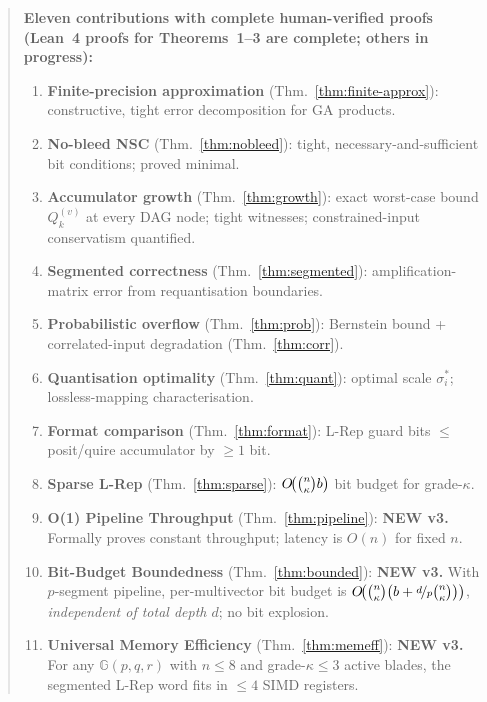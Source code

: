 \documentclass[11pt,a4paper]{article}
\theoremstyle{definition}
\theoremstyle{plain}
\theoremstyle{remark}
\newcommand{\GA}{\mathbb{G}}
\begin{document}
\begin{abstract}
\textbf{Eleven contributions with complete human-verified proofs
(Lean~4 proofs for Theorems~1--3 are complete; others in progress):}
\begin{enumerate}[leftmargin=*,label=\arabic{enumi}.]
  \item \textbf{Finite-precision approximation} (Thm.~\ref{thm:finite-approx}):
        constructive, tight error decomposition for GA products.
  \item \textbf{No-bleed NSC} (Thm.~\ref{thm:nobleed}):
        tight, necessary-and-sufficient bit conditions; proved minimal.
  \item \textbf{Accumulator growth} (Thm.~\ref{thm:growth}):
        exact worst-case bound $Q_k^{(v)}$ at every DAG node;
        tight witnesses; constrained-input conservatism quantified.
  \item \textbf{Segmented correctness} (Thm.~\ref{thm:segmented}):
        amplification-matrix error from requantisation boundaries.
  \item \textbf{Probabilistic overflow} (Thm.~\ref{thm:prob}):
        Bernstein bound + correlated-input degradation (Thm.~\ref{thm:corr}).
  \item \textbf{Quantisation optimality} (Thm.~\ref{thm:quant}):
        optimal scale $\sigma_i^*$; lossless-mapping characterisation.
  \item \textbf{Format comparison} (Thm.~\ref{thm:format}):
        L-Rep guard bits $\le$ posit/quire accumulator by $\ge 1$ bit.
  \item \textbf{Sparse L-Rep} (Thm.~\ref{thm:sparse}):
        $O\!\bigl(\tbinom{n}{\kappa}b\bigr)$ bit budget for grade-$\kappa$.
  \item \textbf{O(1) Pipeline Throughput} (Thm.~\ref{thm:pipeline}): \textbf{NEW v3.}
        Formally proves constant throughput; latency is $O(n)$ for fixed $n$.
  \item \textbf{Bit-Budget Boundedness} (Thm.~\ref{thm:bounded}): \textbf{NEW v3.}
        With $p$-segment pipeline, per-multivector bit budget is
        $O\!\bigl(\tbinom{n}{\kappa}\bigl(b + \nicefrac{d}{p}\tbinom{n}{\kappa}\bigr)\bigr)$,
        \emph{independent of total depth $d$}; no bit explosion.
  \item \textbf{Universal Memory Efficiency} (Thm.~\ref{thm:memeff}): \textbf{NEW v3.}
        For any $\GA(p,q,r)$ with $n\le 8$ and grade-$\kappa \le 3$ active
        blades, the segmented L-Rep word fits in $\le 4$ SIMD registers.
\end{enumerate}


\end{abstract}
\end{document}
